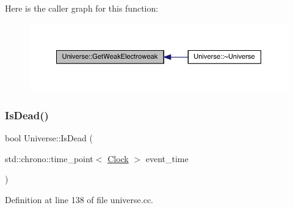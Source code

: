 Here is the caller graph for this function\+:
\nopagebreak
\begin{figure}[H]
\begin{center}
\leavevmode
\includegraphics[width=350pt]{class_universe_a645299738e6b798a037f2a15a2e7cf4d_icgraph}
\end{center}
\end{figure}
\mbox{\label{class_universe_a8fdaa6d06584e1ef50c4c613b22b786e}} 
\subsubsection{\texorpdfstring{Is\+Dead()}{IsDead()}}
{\footnotesize\ttfamily bool Universe\+::\+Is\+Dead (\begin{DoxyParamCaption}\item[{std\+::chrono\+::time\+\_\+point$<$ \hyperlink{universe_8h_a0ef8d951d1ca5ab3cfaf7ab4c7a6fd80}{Clock} $>$}]{event\+\_\+time }\end{DoxyParamCaption})}



Definition at line 138 of file universe.\+cc.


